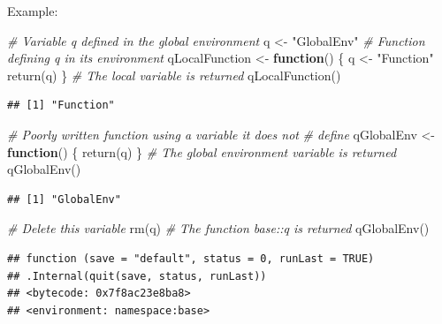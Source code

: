 \documentclass[
  12pt,
  american,
  a4paper,
  extrafontsizes,onecolumn,openright
  ]{memoir}
\newenvironment{Shaded}{\begin{snugshade}}{\end{snugshade}}
\newcommand{\CommentTok}[1]{\textcolor[rgb]{0.56,0.35,0.01}{\textit{#1}}}
\newcommand{\ControlFlowTok}[1]{\textcolor[rgb]{0.13,0.29,0.53}{\textbf{#1}}}
\newcommand{\FunctionTok}[1]{\textcolor[rgb]{0.00,0.00,0.00}{#1}}
\newcommand{\NormalTok}[1]{#1}
\newcommand{\OtherTok}[1]{\textcolor[rgb]{0.56,0.35,0.01}{#1}}
\newcommand{\StringTok}[1]{\textcolor[rgb]{0.31,0.60,0.02}{#1}}
\begin{document}
Example:

\scriptsize

\begin{Shaded}
\begin{Highlighting}[]
\CommentTok{\# Variable q defined in the global environment}
\NormalTok{q }\OtherTok{\textless{}{-}} \StringTok{"GlobalEnv"}
\CommentTok{\# Function defining q in its environment}
\NormalTok{qLocalFunction }\OtherTok{\textless{}{-}} \ControlFlowTok{function}\NormalTok{() \{}
\NormalTok{    q }\OtherTok{\textless{}{-}} \StringTok{"Function"}
    \FunctionTok{return}\NormalTok{(q)}
\NormalTok{\}}
\CommentTok{\# The local variable is returned}
\FunctionTok{qLocalFunction}\NormalTok{()}
\end{Highlighting}
\end{Shaded}

\begin{verbatim}
## [1] "Function"
\end{verbatim}

\begin{Shaded}
\begin{Highlighting}[]
\CommentTok{\# Poorly written function using a variable it does not}
\CommentTok{\# define}
\NormalTok{qGlobalEnv }\OtherTok{\textless{}{-}} \ControlFlowTok{function}\NormalTok{() \{}
    \FunctionTok{return}\NormalTok{(q)}
\NormalTok{\}}
\CommentTok{\# The global environment variable is returned}
\FunctionTok{qGlobalEnv}\NormalTok{()}
\end{Highlighting}
\end{Shaded}

\begin{verbatim}
## [1] "GlobalEnv"
\end{verbatim}

\begin{Shaded}
\begin{Highlighting}[]
\CommentTok{\# Delete this variable}
\FunctionTok{rm}\NormalTok{(q)}
\CommentTok{\# The function base::q is returned}
\FunctionTok{qGlobalEnv}\NormalTok{()}
\end{Highlighting}
\end{Shaded}

\begin{verbatim}
## function (save = "default", status = 0, runLast = TRUE) 
## .Internal(quit(save, status, runLast))
## <bytecode: 0x7f8ac23e8ba8>
## <environment: namespace:base>
\end{verbatim}

\normalsize
\end{document}
